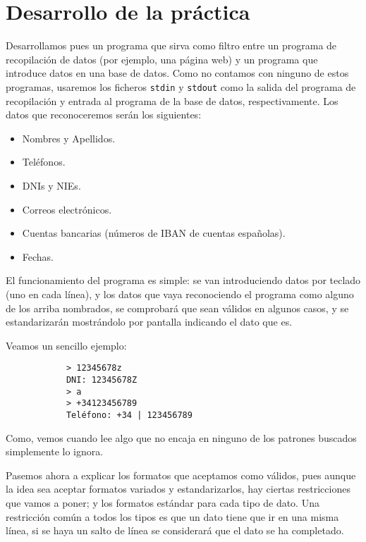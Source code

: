 \documentclass[12pt]{article}
\begin{document}
    \section{Desarrollo de la práctica}
    Desarrollamos pues un programa que sirva como filtro entre un programa de recopilación de datos (por ejemplo, una página web) y un programa que introduce datos en una base de datos. Como no contamos con ninguno de estos programas, usaremos los ficheros \verb|stdin| y \verb|stdout| como la salida del programa de recopilación y entrada al programa de la base de datos, respectivamente. Los datos que reconoceremos serán los siguientes:
    \begin{itemize}
        \item Nombres y Apellidos.
        \item Teléfonos.
        \item DNIs y NIEs.
        \item Correos electrónicos.
        \item Cuentas bancarias (números de IBAN de cuentas españolas).
        \item Fechas.
    \end{itemize}

    El funcionamiento del programa es simple: se van introduciendo datos por teclado (uno en cada línea), y los datos que vaya reconociendo el programa como alguno de los arriba nombrados, se comprobará que sean válidos en algunos casos, y se estandarizarán mostrándolo por pantalla indicando el dato que es.
    \begin{ejemplo}
        Veamos un sencillo ejemplo:
        \begin{verbatim}
            > 12345678z
            DNI: 12345678Z
            > a
            > +34123456789
            Teléfono: +34 | 123456789
        \end{verbatim}
        Como, vemos cuando lee algo que no encaja en ninguno de los patrones buscados simplemente lo ignora. 
    \end{ejemplo}

    Pasemos ahora a explicar los formatos que aceptamos como válidos, pues aunque la idea sea aceptar formatos variados y estandarizarlos, hay ciertas restricciones que vamos a poner; y los formatos estándar para cada tipo de dato. Una restricción común a todos los tipos es que un dato tiene que ir en una misma línea, si se haya un salto de línea se considerará que el dato se ha completado. 
\end{document}
